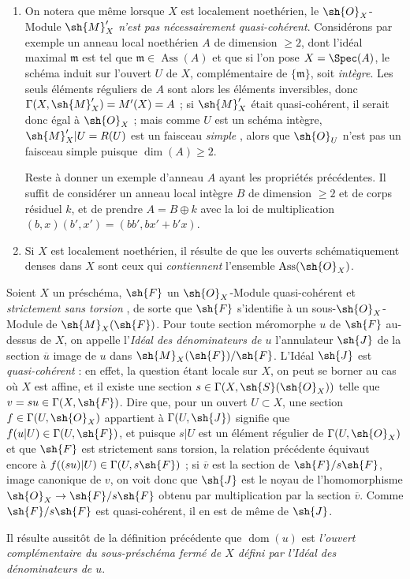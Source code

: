 \begin{remarks}[20.2.13]
\begin{enumerate}[label=(\roman*)]
  \item On notera que même lorsque $X$ est localement noethérien, le $\sh{O}_X$-Module $\sh{M}'_X$ \emph{n'est pas nécessairement quasi-cohérent}.
  Considérons par exemple un anneau local noethérien $A$ de dimension $\geq2$, dont l'idéal maximal $\mathfrak{m}$ est tel que $\mathfrak{m}\in\operatorname{Ass}(A)$ et que si l'on pose $X=\Spec(A)$, le schéma induit sur l'ouvert $U$ de $X$, complémentaire de $\{\mathfrak{m}\}$, soit \emph{intègre}.
  Les seuls éléments réguliers de $A$ sont alors les éléments inversibles, donc $\Gamma(X,\sh{M}'_X)=M'(X)=A$ ; si $\sh{M}'_X$ était quasi-cohérent, il serait donc égal à $\sh{O}_X$ ; mais comme $U$ est un schéma intègre, $\sh{M}'_X|U=R(U)$ est un faisceau \emph{simple} , alors que $\sh{O}_U$ n'est pas un faisceau simple puisque $\dim(A)\geq2$.

  Reste à donner un exemple d'anneau $A$ ayant les propriétés précédentes.
  Il suffit de considérer un anneau local intègre $B$ de dimension $\geq2$ et de corps résiduel $k$, et de prendre $A=B\oplus k$ avec la loi de multiplication $(b,x)(b',x')=(bb',bx'+b'x)$.

  \item Si $X$ est localement noethérien, il résulte de  que les ouverts schématiquement denses dans $X$ sont ceux qui \emph{contiennent} l'ensemble $\operatorname{Ass}(\sh{O}_X)$.
\end{enumerate}
\end{remarks}

\begin{env}[20.2.14]
Soient $X$ un préschéma, $\sh{F}$ un $\sh{O}_X$-Module quasi-cohérent et \emph{strictement sans torsion} , de sorte que $\sh{F}$ s'identifie à un sous-$\sh{O}_X$-Module de $\sh{M}_X(\sh{F})$.
Pour toute section méromorphe $u$ de $\sh{F}$ au-dessus de $X$, on appelle l'\emph{Idéal des dénominateurs de $u$} l'annulateur $\sh{J}$ de la section $\overline{u}$ image de $u$ dans $\sh{M}_X(\sh{F})/\sh{F}$.
L'Idéal $\sh{J}$ est \emph{quasi-cohérent} : en effet, la question étant locale sur $X$, on peut se borner au cas où $X$ est affine, et il existe une section $s\in\Gamma(X,\sh{S}(\sh{O}_X))$ telle que $v=su\in\Gamma(X,\sh{F})$.
Dire que, pour un ouvert $U\subset X$, une section $f\in\Gamma(U,\sh{O}_X)$ appartient à $\Gamma(U,\sh{J})$ signifie que $f(u|U)\in\Gamma(U,\sh{F})$, et puisque $s|U$ est un élément régulier de $\Gamma(U,\sh{O}_X)$ et que $\sh{F}$ est strictement sans torsion, la relation précédente équivaut encore à $f((su)|U)\in\Gamma(U,s\sh{F})$ ; si $\overline{v}$ est la section de $\sh{F}/s\sh{F}$, image canonique de $v$, on voit donc que $\sh{J}$ est le noyau de l'homomorphisme $\sh{O}_X\to\sh{F}/s\sh{F}$ obtenu par multiplication par la section $\overline{v}$.
Comme $\sh{F}/s\sh{F}$ est quasi-cohérent, il en est de même de $\sh{J}$.

Il résulte aussitôt de la définition précédente que $\operatorname{dom}(u)$ est \emph{l'ouvert complémentaire du sous-préschéma fermé de $X$ défini par l'Idéal des dénominateurs de $u$}.
\end{env}

